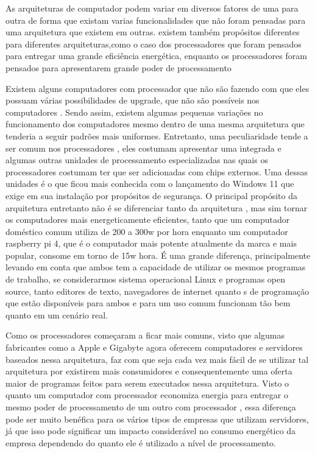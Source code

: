 \documentclass[
	12pt,				%
	openright,			%
	oneside,			%
	a4paper,			%
	english,			%
	french,				%
	spanish,			%
	brazil,				%
	]{abntex2}
\begin{document}
As arquiteturas de computador podem variar em diversos fatores de uma para outra de forma que existam varias funcionalidades que não foram pensadas para uma arquitetura que existem em outras.
existem também propósitos diferentes para diferentes arquiteturas,como o caso dos processadores  que foram pensados para entregar uma grande eficiência energética,
enquanto os processadores  foram pensados para apresentarem grande poder de processamento\newline

Existem alguns computadores com processador  que não são  fazendo com que eles possuam várias possibilidades de upgrade, que não são possíveis nos computadores .
Sendo assim, existem algumas pequenas variações no funcionamento dos computadores mesmo dentro de uma mesma arquitetura que tenderia a seguir padrões mais uniformes.
Entretanto, uma peculiaridade tende a ser comum nos processadores ,
eles costumam apresentar uma  integrada e algumas outras unidades de processamento especializadas nas quais os processadores  costumam ter que ser adicionadas com chips externos.
Uma dessas unidades é o  que ficou mais conhecida com o lançamento do Windows 11 que exige em sua instalação por propósitos de segurança.
O principal propósito da arquitetura  entretanto não é se diferenciar tanto da arquitetura , mas sim tornar os computadores mais energeticamente eficientes, 
tanto que um computador doméstico comum utiliza de 200 a 300w por hora enquanto um computador raspberry pi 4, que é o computador  mais potente atualmente da marca e mais popular, 
consome em torno de 15w hora. É uma grande diferença, principalmente levando em conta que ambos tem a capacidade de utilizar os mesmos programas de trabalho,
se considerarmos sistema operacional Linux e programas open source, tanto editores de texto, navegadores de internet quanto s de programação que estão disponíveis para ambos e para um uso comum funcionam tão bem quanto em um cenário real.\newline

Como os processadores  começaram a ficar mais comuns, visto que algumas fabricantes como a Apple e Gigabyte agora oferecem computadores e servidores baseados nessa arquitetura,
faz com que seja cada vez mais fácil de se utilizar tal arquitetura por existirem mais consumidores e consequentemente uma oferta maior de programas feitos para serem executados nessa arquitetura.
Visto o quanto um computador com processador  economiza energia para entregar o mesmo poder de processamento de um outro com processador ,
essa diferença pode ser muito benéfica para os vários tipos de empresas que utilizam servidores, já que isso pode significar um impacto considerável no consumo energético da empresa dependendo do quanto ele é utilizado a nível de processamento.\newline
\end{document}
